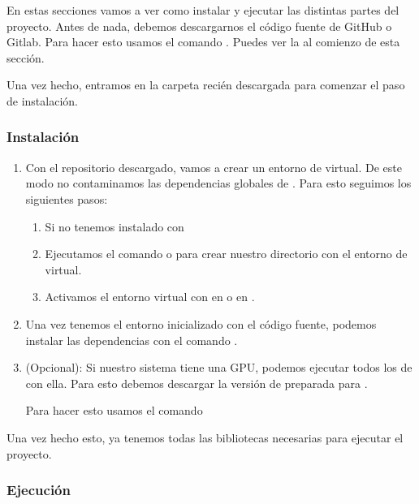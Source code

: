 En estas secciones vamos a ver como instalar y ejecutar las distintas partes del proyecto. Antes de nada, debemos descargarnos el código fuente de GitHub o Gitlab. Para hacer esto usamos el comando . Puedes ver la  al comienzo de esta sección.

Una vez hecho, entramos en la carpeta recién descargada para comenzar el paso de instalación.

\subsubsection{Instalación}
\begin{enumerate}
  \item Con el repositorio descargado, vamos a crear un entorno de  virtual. De este modo no contaminamos las dependencias globales de . Para esto seguimos los siguientes pasos:
        \begin{enumerate}
          \item Si no tenemos instalado con 
          \item Ejecutamos el comando  o  para crear nuestro directorio  con el entorno de  virtual.
          \item Activamos el entorno virtual con  en  o  en .
        \end{enumerate}

  \item Una vez tenemos el entorno inicializado con el código fuente, podemos instalar las dependencias con el comando .

  \item (Opcional): Si nuestro sistema tiene una GPU, podemos ejecutar todos los  de  con ella. Para esto debemos descargar la versión de  preparada para .

        Para hacer esto usamos el comando 
\end{enumerate}

Una vez hecho esto, ya tenemos todas las bibliotecas necesarias para ejecutar el proyecto.

\subsubsection{Ejecución}

